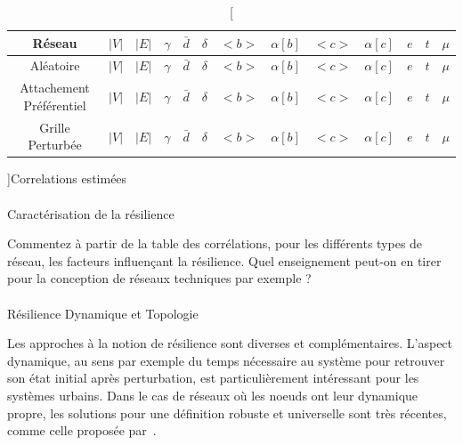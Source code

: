 \begin{table}
\begin{tabular}{c|c|c|c|c|c|c|c|c|c|c|c|c}
\hline
Réseau & $\left|V\right|$ & $\left|E\right|$ & $\gamma$ & $\bar{d}$ & $\delta$ & $<b>$ & $\alpha \left[b\right]$ & $<c>$ & $\alpha\left[c\right]$ & $e$ & $t$ & $\mu$\\\hline
Aléatoire & $\left|V\right|$ & $\left|E\right|$ & $\gamma$ & $\bar{d}$ & $\delta$ & $<b>$ & $\alpha \left[b\right]$ & $<c>$ & $\alpha\left[c\right]$ & $e$ & $t$ & $\mu$\\\hline
Attachement Préférentiel & $\left|V\right|$ & $\left|E\right|$ & $\gamma$ & $\bar{d}$ & $\delta$ & $<b>$ & $\alpha \left[b\right]$ & $<c>$ & $\alpha\left[c\right]$ & $e$ & $t$ & $\mu$\\\hline
Grille Perturbée & $\left|V\right|$ & $\left|E\right|$ & $\gamma$ & $\bar{d}$ & $\delta$ & $<b>$ & $\alpha \left[b\right]$ & $<c>$ & $\alpha\left[c\right]$ & $e$ & $t$ & $\mu$\\\hline
\end{tabular}
\caption[][]{}{Correlations estimées \label{tab:corr}}
\end{table}


\medskip

\paragraph{}{Caractérisation de la résilience}

Commentez à partir de la table des corrélations, pour les différents types de réseau, les facteurs influençant la résilience. Quel enseignement peut-on en tirer pour la conception de réseaux techniques par exemple ?



\paragraph{}{Résilience Dynamique et Topologie}

Les approches à la notion de résilience sont diverses et complémentaires. L'aspect dynamique, au sens par exemple du temps nécessaire au système pour retrouver son état initial après perturbation, est particulièrement intéressant pour les systèmes urbains. Dans le cas de réseaux où les noeuds ont leur dynamique propre, les solutions pour une définition robuste et universelle sont très récentes, comme celle proposée par~\cite{gao2016universal}.


